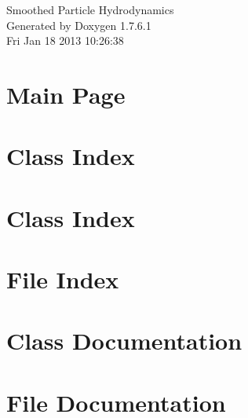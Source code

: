 \documentclass[a4paper]{book}
\begin{document}
\hypersetup{pageanchor=false,citecolor=blue}
\begin{titlepage}
\vspace*{7cm}
\begin{center}
{\Large \-Smoothed \-Particle \-Hydrodynamics }\\
\vspace*{1cm}
{\large \-Generated by Doxygen 1.7.6.1}\\
\vspace*{0.5cm}
{\small Fri Jan 18 2013 10:26:38}\\
\end{center}
\end{titlepage}
\clearemptydoublepage
{}
\tableofcontents
\clearemptydoublepage
{}
\hypersetup{pageanchor=true,citecolor=blue}
\chapter{\-Main \-Page}
\label{index}\hypertarget{index}{}
\chapter{\-Class \-Index}

\chapter{\-Class \-Index}

\chapter{\-File \-Index}

\chapter{\-Class \-Documentation}















\chapter{\-File \-Documentation}























\printindex
\end{document}
